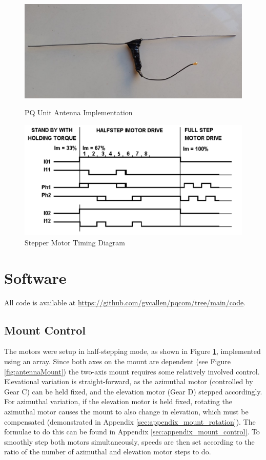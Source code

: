 \graphicspath{{./figures}}

\begin{figure}[!htb]
  \begin{minipage}{.45\textwidth}
    \centering
    \includegraphics[width=0.9\linewidth]{pqAntenna}
    \caption{PQ Unit Antenna Implementation}
    \label{fig:pqAntenna}
  \end{minipage}
  \begin{minipage}{.49\textwidth}
    \centering
    \includegraphics[width=0.98\linewidth]{stepperTiming}
    \caption{Stepper Motor Timing Diagram \cite{datasheet-L6219}}
    \label{fig:stepperTiming}
  \end{minipage}
\end{figure}

\section{Software}
All code is available at \url{https://github.com/gvcallen/pqcom/tree/main/code}.

\subsection{Mount Control}
The motors were setup in half-stepping mode, as shown in Figure \ref{fig:stepperTiming}, implemented using an array. Since both axes on the mount are dependent (see Figure \ref{fig:antennaMount}) the two-axis mount requires some relatively involved control. Elevational variation is straight-forward, as the azimuthal motor (controlled by Gear C) can be held fixed, and the elevation motor (Gear D) stepped accordingly. For azimuthal variation, if the elevation motor is held fixed, rotating the azimuthal motor causes the mount to also change in elevation, which must be compensated (demonstrated in Appendix \ref{sec:appendix_mount_rotation}). The formulae to do this can be found in Appendix \ref{sec:appendix_mount_control}. To smoothly step both motors simultaneously, speeds are then set according to the ratio of the number of azimuthal and elevation motor steps to do.

